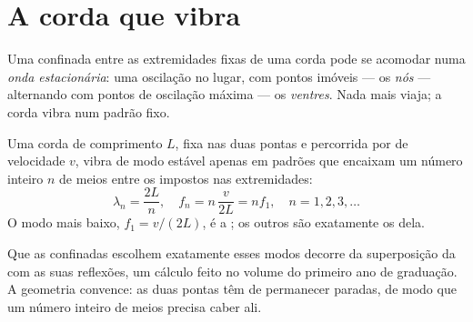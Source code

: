 \section{A corda que vibra}

\begin{definition}\label{def:g12:sound-acoustics:standing-wave}
Uma  confinada entre as extremidades fixas de uma corda pode se
acomodar numa \emph{onda estacionária}: uma
oscilação no lugar, com pontos imóveis --- os \emph{nós} ---
alternando com pontos de oscilação máxima --- os
\emph{ventres}. Nada mais viaja; a corda vibra num padrão
fixo.
\end{definition}

\begin{proposition}\label{prop:g12:sound-acoustics:string-modes}
Uma corda de comprimento $L$, fixa nas duas pontas e percorrida por 
de velocidade $v$, vibra de modo estável apenas em padrões que encaixam
um número inteiro $n$ de meios  entre os  impostos
nas extremidades:
\[ \lambda_n = \frac{2L}{n}, \quad f_n = n\,\frac{v}{2L} = n f_1, \quad n = 1, 2, 3, \dots \]
O modo mais baixo, $f_1 = v/(2L)$, é a ; os outros são
exatamente os  dela. \admitted
\end{proposition}

\begin{remark}\label{rem:g12:sound-acoustics:honest}
Que as  confinadas escolhem exatamente esses modos decorre da
superposição da  com as suas reflexões, um cálculo feito no volume do
primeiro ano de graduação. A geometria convence: as duas pontas têm de
permanecer paradas, de modo que um número inteiro de meios  precisa caber ali.
\end{remark}

